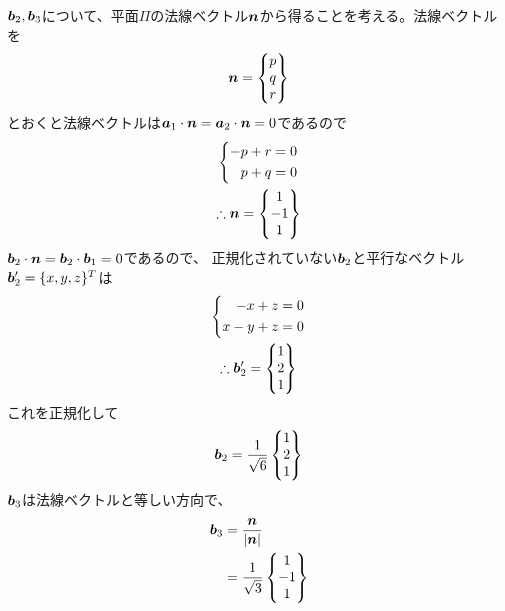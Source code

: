 \begin{other*}
  ${\bm{b}}_2,{\bm{b}}_3$について、平面$\Pi$の法線ベクトル${\bm{n}}$から得ることを考える。法線ベクトルを
  \begin{gather}
    {\bm{n}} =
    \begin{Bmatrix}
      p \\ q \\ r
    \end{Bmatrix}
  \end{gather}
  とおくと法線ベクトルは${\bm{a}}_1\cdot{\bm{n}}={\bm{a}}_2\cdot{\bm{n}}=0$であるので
  \begin{gather}
    \left\{
    \begin{aligned}
      -p + r &= 0 \\
      p + q &= 0
    \end{aligned}
    \right.
    \\
    \therefore {\bm{n}} =
    \begin{Bmatrix}
      1 \\ -1 \\ 1
    \end{Bmatrix}
  \end{gather}
  ${\bm{b}}_2\cdot{\bm{n}}={\bm{b}}_2\cdot{\bm{b}}_1=0$であるので、
  正規化されていない${\bm{b}}_2$と平行なベクトル${\bm{b}}'_2 = \{x, y, z\}^T$は
  \begin{gather}
    \left\{
    \begin{aligned}
      -x + z &= 0 \\
      x - y + z &= 0
    \end{aligned}
    \right.
    \\
    \therefore {\bm{b}}'_2 =
    \begin{Bmatrix}
      1 \\ 2 \\ 1
    \end{Bmatrix}
  \end{gather}
  これを正規化して
  \begin{gather}
    {\bm{b}}_2 =
    \frac{1}{\sqrt{6}}
    \begin{Bmatrix}
      1 \\ 2 \\ 1
    \end{Bmatrix}
  \end{gather}
  ${\bm{b}}_3$は法線ベクトルと等しい方向で、
  \begin{align}
    {\bm{b}}_3
    &= \frac{{\bm{n}}}{|{\bm{n}}|} \\
    &= \frac{1}{\sqrt{3}}
    \begin{Bmatrix}
      1 \\ -1 \\ 1
    \end{Bmatrix}
  \end{align}
\end{other*}
